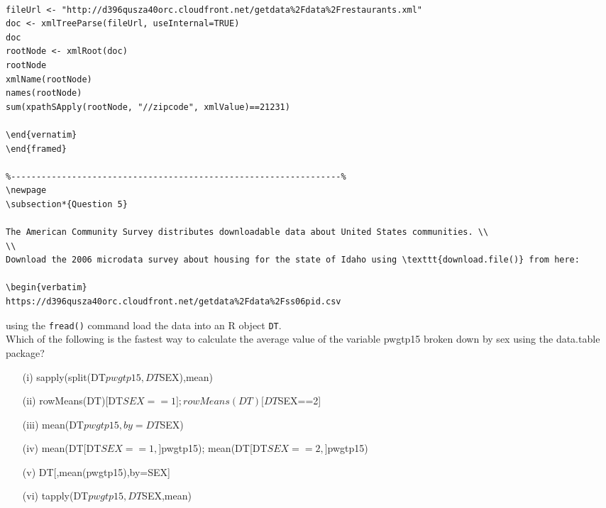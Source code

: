 \documentclass[]{article}
\begin{document}
\begin{framed}

\begin{verbatim}

fileUrl <- "http://d396qusza40orc.cloudfront.net/getdata%2Fdata%2Frestaurants.xml"
doc <- xmlTreeParse(fileUrl, useInternal=TRUE)
doc
rootNode <- xmlRoot(doc)
rootNode
xmlName(rootNode)
names(rootNode)
sum(xpathSApply(rootNode, "//zipcode", xmlValue)==21231) 

\end{vernatim}
\end{framed}

%-----------------------------------------------------------------%
\newpage
\subsection*{Question 5}
 
The American Community Survey distributes downloadable data about United States communities. \\
\\
Download the 2006 microdata survey about housing for the state of Idaho using \texttt{download.file()} from here:
 
\begin{verbatim}
https://d396qusza40orc.cloudfront.net/getdata%2Fdata%2Fss06pid.csv
\end{verbatim}
 using the \texttt{fread()} command load the data into an R object \texttt{DT}.\\ Which of the following is the fastest way to calculate the average value of the variable pwgtp15  broken down by sex using the data.table package? 

\begin{itemize}
\item[(i)] sapply(split(DT$pwgtp15,DT$SEX),mean) 

\item[(ii)] rowMeans(DT)[DT$SEX==1]; rowMeans(DT)[DT$SEX==2] 

\item[(iii)] mean(DT$pwgtp15,by=DT$SEX) 

\item[(iv)] mean(DT[DT$SEX==1,]$pwgtp15); mean(DT[DT$SEX==2,]$pwgtp15) 

\item[(v)] DT[,mean(pwgtp15),by=SEX] 

\item[(vi)] tapply(DT$pwgtp15,DT$SEX,mean)
\end{itemize}


\end{framed}
\end{document}
